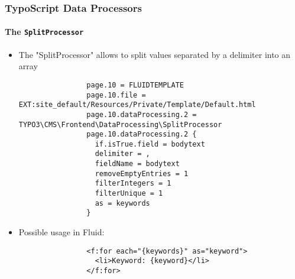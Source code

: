 \begin{frame}[fragile]
	\frametitle{TypoScript Data Processors}
	\framesubtitle{The \texttt{SplitProcessor}}

	\lstset{basicstyle=\tiny\ttfamily}

	\begin{itemize}

		\item The "SplitProcessor" allows to split values separated by a delimiter into an array

			\begin{lstlisting}
				page.10 = FLUIDTEMPLATE
				page.10.file = EXT:site_default/Resources/Private/Template/Default.html
				page.10.dataProcessing.2 = TYPO3\CMS\Frontend\DataProcessing\SplitProcessor
				page.10.dataProcessing.2 {
				  if.isTrue.field = bodytext
				  delimiter = ,
				  fieldName = bodytext
				  removeEmptyEntries = 1
				  filterIntegers = 1
				  filterUnique = 1
				  as = keywords
				}
			\end{lstlisting}

		\item Possible usage in Fluid:

			\begin{lstlisting}
				<f:for each="{keywords}" as="keyword">
				  <li>Keyword: {keyword}</li>
				</f:for>
			\end{lstlisting}

	\end{itemize}

\end{frame}



